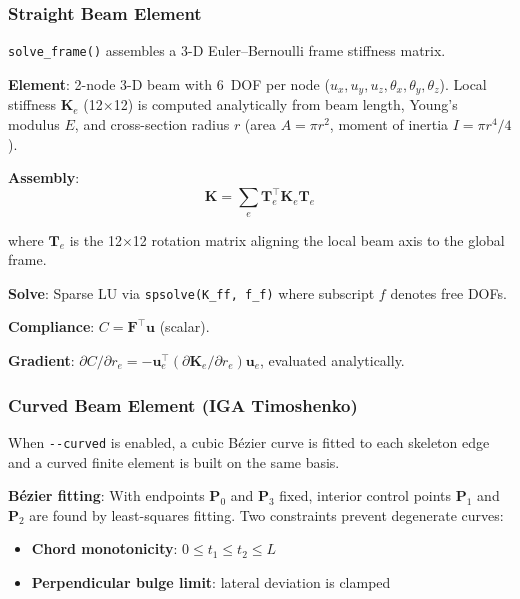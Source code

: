 \documentclass[a4paper, 11pt, openany]{report}
\begin{document}
\subsubsection{Straight Beam Element}

\texttt{solve\_frame()} assembles a 3-D Euler--Bernoulli frame stiffness matrix.

\textbf{Element}: 2-node 3-D beam with 6~DOF per node
($u_x, u_y, u_z, \theta_x, \theta_y, \theta_z$).  Local stiffness
$\mathbf{K}_e$ (12$\times$12) is computed analytically from beam length, Young's
modulus $E$, and cross-section radius $r$ (area $A = \pi r^2$, moment of inertia
$I = \pi r^4/4$).

\textbf{Assembly}:
\begin{equation}
\label{eq:assembly}
\mathbf{K} = \sum_e \mathbf{T}_e^\top \mathbf{K}_e \mathbf{T}_e
\end{equation}

where $\mathbf{T}_e$ is the 12$\times$12 rotation matrix aligning the local
beam axis to the global frame.

\textbf{Solve}: Sparse LU via \texttt{spsolve(K\_ff, f\_f)} where subscript $f$
denotes free DOFs.

\textbf{Compliance}: $C = \mathbf{F}^\top \mathbf{u}$ (scalar).

\textbf{Gradient}:
$\partial C / \partial r_e = -\mathbf{u}_e^\top (\partial \mathbf{K}_e / \partial r_e) \mathbf{u}_e$,
evaluated analytically.


\subsubsection{Curved Beam Element (IGA Timoshenko)}

When \texttt{-{}-curved} is enabled, a cubic B\'ezier curve is fitted to each
skeleton edge and a curved finite element is built on the same basis.

\textbf{B\'ezier fitting}: With endpoints $\mathbf{P}_0$ and $\mathbf{P}_3$
fixed, interior control points $\mathbf{P}_1$ and $\mathbf{P}_2$ are found by
least-squares fitting.  Two constraints prevent degenerate curves:

\begin{itemize}[nosep]
    \item \textbf{Chord monotonicity}: $0 \le t_1 \le t_2 \le L$
    \item \textbf{Perpendicular bulge limit}: lateral deviation is clamped
\end{itemize}
\end{document}
